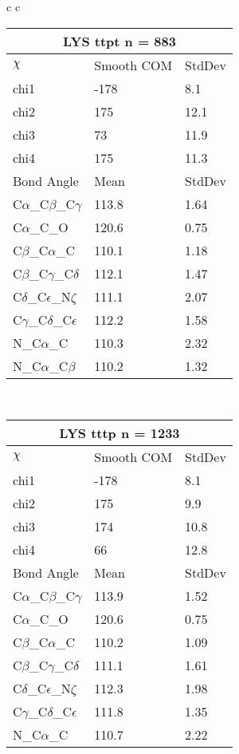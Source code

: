 \begin{longtable}{ c c }
  \begin{tabular}{ l l l }
  \toprule
  \multicolumn{3}{c}{LYS \textbf{ttpt} n = 883} \\ \toprule
  $\chi$       & Smooth COM & StdDev \\ \midrule
  chi1 & -178 & 8.1 \\ 
  chi2 & 175 & 12.1 \\ 
  chi3 & 73 & 11.9 \\ 
  chi4 & 175 & 11.3 \\ \midrule
  Bond Angle   & Mean     & StdDev \\ \midrule
  C$\alpha$\_C$\beta$\_C$\gamma$ & 113.8 & 1.64\\
  C$\alpha$\_C\_O & 120.6 & 0.75\\
  C$\beta$\_C$\alpha$\_C & 110.1 & 1.18\\
  C$\beta$\_C$\gamma$\_C$\delta$ & 112.1 & 1.47\\
  C$\delta$\_C$\epsilon$\_N$\zeta$ & 111.1 & 2.07\\
  C$\gamma$\_C$\delta$\_C$\epsilon$ & 112.2 & 1.58\\
  N\_C$\alpha$\_C & 110.3 & 2.32\\
  N\_C$\alpha$\_C$\beta$ & 110.2 & 1.32\\
  \bottomrule
  \end{tabular}
  \\
  \begin{tabular}{ l l l }
  \toprule
  \multicolumn{3}{c}{LYS \textbf{tttp} n = 1233} \\ \toprule
  $\chi$       & Smooth COM & StdDev \\ \midrule
  chi1 & -178 & 8.1 \\ 
  chi2 & 175 & 9.9 \\ 
  chi3 & 174 & 10.8 \\ 
  chi4 & 66 & 12.8 \\ \midrule
  Bond Angle   & Mean     & StdDev \\ \midrule
  C$\alpha$\_C$\beta$\_C$\gamma$ & 113.9 & 1.52\\
  C$\alpha$\_C\_O & 120.6 & 0.75\\
  C$\beta$\_C$\alpha$\_C & 110.2 & 1.09\\
  C$\beta$\_C$\gamma$\_C$\delta$ & 111.1 & 1.61\\
  C$\delta$\_C$\epsilon$\_N$\zeta$ & 112.3 & 1.98\\
  C$\gamma$\_C$\delta$\_C$\epsilon$ & 111.8 & 1.35\\
  N\_C$\alpha$\_C & 110.7 & 2.22\\

\end{tabular}
\end{longtable}
